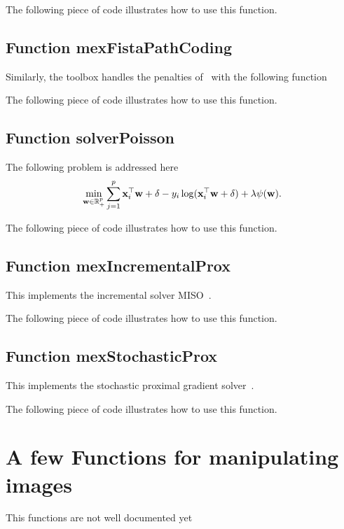 \documentclass[a4paper, 11pt]{article}
\begin{document}
%    

The following piece of code illustrates how to use this function.


\subsection{Function mexFistaPathCoding}
Similarly, the toolbox handles the penalties of~\cite{mairal14} with the following function

The following piece of code illustrates how to use this function.


\subsection{Function solverPoisson}
The following problem is addressed here
\begin{displaymath}
   \min_{{\mathbf w} \in {\mathbb R}_+^p}  \sum_{j=1}^p {\mathbf x}_i^\top {\mathbf w} + \delta - y_i \log({\mathbf x}_i^\top {\mathbf w} +\delta) + \lambda \psi({\mathbf w}).
\end{displaymath}

The following piece of code illustrates how to use this function.


\subsection{Function mexIncrementalProx}
This implements the incremental solver MISO~\cite{mairal16}.

The following piece of code illustrates how to use this function.


\subsection{Function mexStochasticProx}
This implements the stochastic proximal gradient solver~\cite{mairal15}.

The following piece of code illustrates how to use this function.


\section{A few Functions for manipulating images}
This functions are not well documented yet
\end{document}

